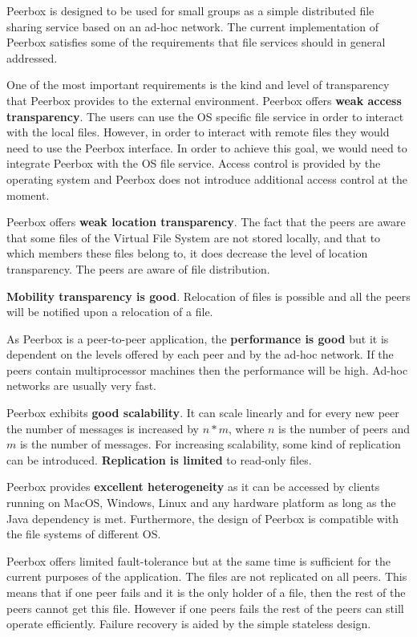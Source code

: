 
Peerbox is designed to be used for small groups as a simple distributed file sharing service based on an ad-hoc network. The current implementation of Peerbox satisfies some of the requirements that file services should in general addressed.


One of the most important requirements is the kind and level of transparency that Peerbox provides to the external environment. Peerbox offers \textbf{weak access transparency}. The users can use the OS specific file service in order to interact with the local files. However, in order to interact with remote files they would need to use the Peerbox interface. In order to achieve this goal, we would need to integrate Peerbox with the OS file service.  Access control is provided by the operating system and Peerbox does not introduce additional access control at the moment.

Peerbox offers \textbf{weak location transparency}. The fact that the peers are aware that some files of the Virtual File System are not stored locally, and that to which members these files belong to, it does decrease the level of location transparency. The peers are aware of file distribution.

\textbf{Mobility transparency is good}. Relocation of files is possible and all the peers will be notified upon a relocation of a file. 


As Peerbox is a peer-to-peer application, the \textbf{performance is good} but it is dependent on the levels offered by each peer and by the ad-hoc network. If the peers contain multiprocessor machines then the performance will be high. Ad-hoc networks are usually very fast.


Peerbox exhibits \textbf{good scalability}. It can scale linearly and for every new peer the number of messages is increased by $n*m$, where $n$ is the number of peers and $m$ is the number of messages. For increasing scalability, some kind of replication can be introduced. \textbf{Replication is limited} to read-only files.



Peerbox provides \textbf{excellent heterogeneity} as it can be accessed by clients running on MacOS, Windows, Linux and any hardware platform as long as the Java dependency is met. Furthermore, the design of Peerbox is compatible with the file systems of different OS.


Peerbox offers limited fault-tolerance but at the same time is sufficient for the current purposes of the application. The files are not replicated on all peers. This means that if one peer fails and it is the only holder of a file, then the rest of the peers cannot get this file. However if one peers fails the rest of the peers can still operate efficiently. Failure recovery is aided by the simple stateless design.


